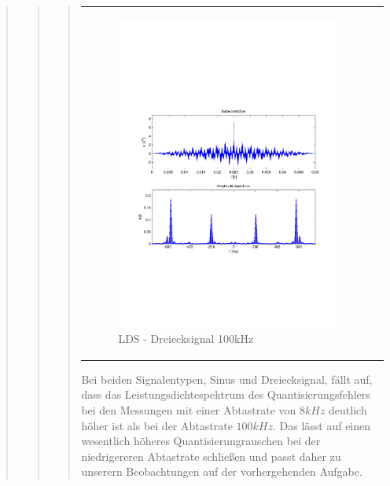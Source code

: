 \begin{quote}
\begin{quote}
\begin{quote}
\begin{center}
\begin{tabular}{ll}
                \begin{minipage}{0.6\textwidth}
                    \begin{figure}[H]
                        \includegraphics[scale=0.4, trim = 1.5cm 7cm 1.5cm 8cm, clip]
                        {./Bilder/drei100_Quantisierungsfehler_LDS}
                          \caption{LDS - Dreiecksignal 100kHz}
                    \end{figure}
                \end{minipage}
            
            \end{tabular}
        \end{center}
			
		Bei beiden Signalentypen, Sinus und Dreiecksignal, fällt auf, dass das Leistungsdichtespektrum des
		Quantisierungsfehlers bei den Messungen mit einer Abtastrate von $8 kHz$ deutlich höher ist als bei der Abtastrate
		$100 kHz$. Das lässt auf einen wesentlich höheres Quantisierungrauschen bei der niedrigereren Abtastrate schließen und
		passt daher zu unserern Beobachtungen auf der vorhergehenden Aufgabe.
			
		\end{quote} %
    \end{quote}  %
         	
\end{quote}%

